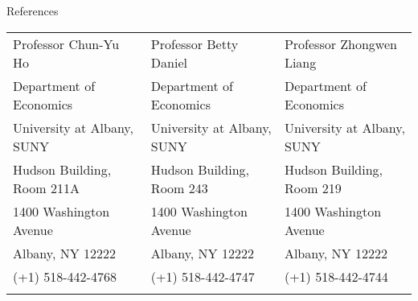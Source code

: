 \documentclass{resume_liang} %
\begin{document}
\begin{rSection}{References}
\begin{tabular}{lll}
	Professor Chun-Yu Ho  & Professor Betty Daniel  & Professor Zhongwen Liang \\ 
	Department of Economics &  Department of Economics & Department of Economics  \\
	University at Albany, SUNY & University at Albany, SUNY & University at Albany, SUNY  \\
	Hudson Building, Room 211A & Hudson Building, Room 243 & Hudson Building, Room 219 \\
	1400 Washington Avenue & 1400 Washington Avenue & 1400 Washington Avenue \\
	Albany, NY 12222 & Albany, NY 12222 & Albany, NY 12222 \\
	(+1) 518-442-4768 & (+1) 518-442-4747 & (+1) 518-442-4744 \\
	\href{mailto:cho@albany.edu}{\color{blue}{cho@albany.edu}} & \href{mailto:bdaniel@albany.edu}{\color{blue}{bdaniel@albany.edu}} & \href{mailto:zliang3@albany.edu}{\color{blue}{zliang3@albany.edu}}\\
\end{tabular}
\end{rSection}
\bigskip
\end{document}
